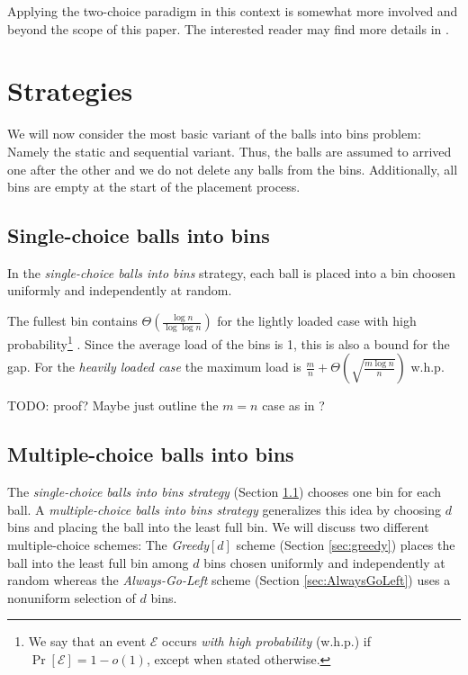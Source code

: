 \documentclass{acm_proc_article-sp}
\begin{document}
Applying the two-choice paradigm in this context is somewhat more involved and beyond the scope of this paper. The interested reader may find more details in \cite{CMM+98}.

\section{Strategies}
\label{sec:strategies}
We will now consider the most basic variant of the balls into bins problem: Namely the static and sequential variant. Thus, the balls are assumed to arrived one after the other and we do not delete any balls from the bins. Additionally, all bins are empty at the start of the placement process.

\subsection{Single-choice balls into bins}
\label{sec:single-choice}
In the \emph{single-choice balls into bins} strategy, each ball is placed into a bin choosen uniformly and independently at random. 

The fullest bin contains $\Theta \left( \frac{\log n}{\log \log n} \right)$ for the lightly loaded case with high probability\footnote{We say that an event $\mathcal E$ occurs \emph{with high probability} (w.h.p.) if $\Pr\left[\mathcal E \right] = 1 - o(1)$, except when stated otherwise.} \cite{RS98}. Since the average load of the bins is 1, this is also a bound for the gap. 
For the \emph{heavily loaded case} the maximum load is $\frac{m}{n} + \Theta\left(\sqrt{\frac{m \log n}{n}}\right)$ w.h.p.

TODO: proof? Maybe just outline the $m = n$ case as in \cite{RS98}?

\subsection{Multiple-choice balls into bins}
\label{sec:multiple-choice}
The \emph{single-choice balls into bins strategy} (Section \ref{sec:single-choice}) chooses one bin for each ball. A \emph{multiple-choice balls into bins strategy} generalizes this idea by choosing $d$ bins and placing the ball into the least full bin. We will discuss two different multiple-choice schemes: The \emph{Greedy$[d]$} scheme (Section \ref{sec:greedy}) places the ball into the least full bin among $d$ bins chosen uniformly and independently at random whereas the \emph{Always-Go-Left} scheme (Section \ref{sec:AlwaysGoLeft}) uses a nonuniform selection of $d$ bins.
\end{document}
